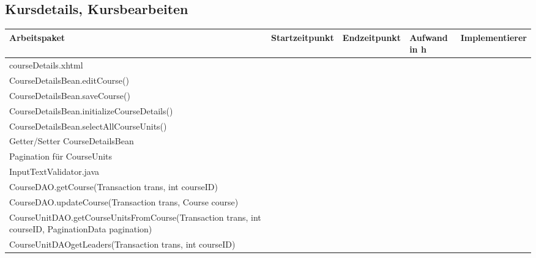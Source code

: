 \begin{landscape}
	\subsection{Kursdetails, Kursbearbeiten}
	\begin{tabular}{|p{10cm}|p{4cm}|p{3cm}|p{3cm}|p{3cm}|}
		\hline  \textbf{Arbeitspaket} & \textbf{Startzeitpunkt} & \textbf{Endzeitpunkt} & \textbf{Aufwand in h} & \textbf{Implementierer} \\ 
		\hline   courseDetails.xhtml                                         &                            &                             &                     &\\
		\hline   CourseDetailsBean.editCourse()                              &                            &                             &                     &\\
		\hline   CourseDetailsBean.saveCourse()                              &                            &                             &                     &\\
		\hline   CourseDetailsBean.initializeCourseDetails()                 &                            &                             &                     &\\
		\hline   CourseDetailsBean.selectAllCourseUnits()                    &                            &                             &                     &\\
		\hline   Getter/Setter CourseDetailsBean                             &                            &                             &                     &\\
		\hline   Pagination für CourseUnits                                  &                            &                             &                     &\\
		\hline   InputTextValidator.java                                     &                            &                             &                     &\\ 
		\hline   CourseDAO.getCourse(Transaction trans, int courseID)        &                            &                             &                     &\\ 
		\hline   CourseDAO.updateCourse(Transaction trans, Course course)    &                            &                             &                     &\\
		\hline   CourseUnitDAO.getCourseUnitsFromCourse(Transaction trans, int courseID, PaginationData pagination) &                            &                             &                     &\\
		\hline   CourseUnitDAOgetLeaders(Transaction trans, int courseID)    &                            &                             &                     &\\
		\hline 
	\end{tabular} \ \\
	\ \\
	

\end{landscape}

